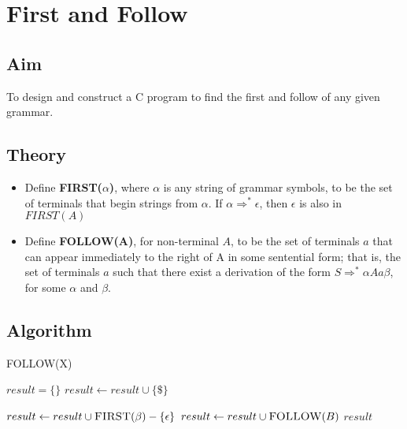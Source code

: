 \clearpage
\chapter{First and Follow}

\section{Aim}
To design and construct a C program to find the first and follow of any given grammar.

\section{Theory}
\begin{itemize}
	\item Define \textbf{FIRST($\alpha$)}, where $\alpha$ is any string of grammar symbols, to be the set of terminals that begin strings from $\alpha$. If $\alpha \Rightarrow^* \epsilon$, then $\epsilon$ is also in $FIRST(A)$
	
	\item Define \textbf{FOLLOW(A)}, for non-terminal $A$, to be the set of terminals $a$ that can appear immediately to the right of A in some sentential form; that is, the set of terminals $a$ such that there exist a derivation of the form $S \Rightarrow^* \alpha A a \beta$, for some $\alpha$ and $\beta$.
\end{itemize}


\section{Algorithm}

\begin{algorithm}[H]
	\caption{FOLLOW(X)}
	\begin{algorithmic}[1]
		\State $result = \{\}$
		\State $result \gets result \cup \{\$\}$
		\EndIf
		
		\State $result \gets result \cup \Call{FIRST}{\beta} - \{\epsilon \}$
		\State $result \gets result \cup \Call{FOLLOW}{B}$
		\EndIf
		\EndFor
		\State \Return $result$
		\EndProcedure
	\end{algorithmic}
\end{algorithm}

